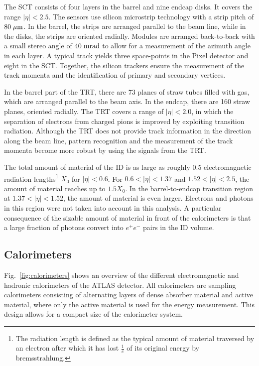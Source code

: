 The SCT consists of four layers in the barrel and nine endcap disks.
It covers the range \mbox{$|\eta| < 2.5$}.
The sensors use silicon microstrip technology with a strip pitch of \mbox{$80 \; \mu\mathrm{m}$}.
In the barrel, the strips are arranged parallel to the beam line, while in the disks, the strips are oriented radially.
Modules are arranged back-to-back with a small stereo angle of \mbox{$40 \; \mathrm{mrad}$} to allow for a measurement of the azimuth angle in each layer.
A typical track yields three space-points in the Pixel detector and eight in the SCT.
Together, the silicon trackers ensure the measurement of the track momenta and the identification of primary and secondary vertices.

In the barrel part of the TRT, there are 73 planes of straw tubes filled with gas, which are arranged parallel to the beam axis.
In the endcap, there are 160 straw planes, oriented radially.
The TRT covers a range of \mbox{$|\eta| < 2.0$}, in which the separation of electrons from charged pions is improved by exploiting transition radiation.
Although the TRT does not provide track information in the direction along the beam line, pattern recognition and the measurement of the track momenta
become more robust by using the signals from the TRT.

The total amount of material of the ID is as large as roughly 0.5 electromagnetic radiation
lengths\footnote{The radiation length is defined as the typical amount of material traversed by an electron after which it has lost
$\frac{1}{e}$ of its original energy by bremsstrahlung.}
$X_0$ for \mbox{$|\eta| < 0.6$}.
For \mbox{$0.6 < |\eta| < 1.37$} and \mbox{$1.52 < |\eta| < 2.5$}, the amount of material reaches up to \mbox{$1.5 X_0$}.
In the barrel-to-endcap transition region at \mbox{$1.37 < |\eta| < 1.52$}, the amount of material is even larger.
Electrons and photons in this region were not taken into account in this analysis.
A particular consequence of the sizable amount of material in front of the calorimeters is that a large fraction of photons convert into \mbox{$e^+e^-$}
pairs in the ID volume.

\subsection{Calorimeters}
\label{sec:calorimeter}

Fig.~\ref{fig:calorimeters} shows an overview of the different electromagnetic and hadronic calorimeters of the ATLAS detector.
All calorimeters are sampling calorimeters consisting of alternating layers of dense absorber material and active material, where only the active
material is used for the energy measurement.
This design allows for a compact size of the calorimeter system.

